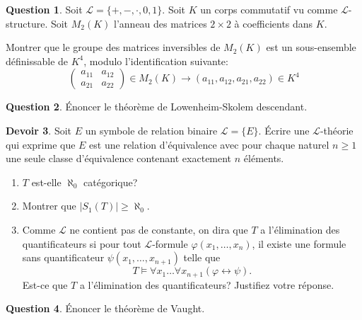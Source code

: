 \documentclass[a4paper, 12pt]{article}
\theoremstyle{definition} \newtheorem{quest}{Question}
\theoremstyle{definition} \newtheorem{dev}[quest]{Devoir}
\begin{document}
\begin{quest}
  Soit $\mathscr L=\{+, -, \cdot, 0, 1\}$.
  Soit $K$ un corps commutatif vu comme $\mathscr L$-structure.
  Soit $M_2(K)$ l'anneau des matrices $2\times 2$ à coefficients
  dans $K$.

  Montrer que le groupe des matrices inversibles de $M_2(K)$
  est un sous-ensemble définissable de $K^4$, modulo
  l'identification suivante:
  \begin{equation*}
    \left( \begin{matrix}
        a_{1 1} & a_{1 2} \\
        a_{2 1} & a_{2 2}
      \end{matrix} \right)\in M_2(K)
    \rightarrow (a_{1 1}, a_{1 2}, a_{2 1}, a_{2 2}) \in K^4
  \end{equation*}
\end{quest}

\begin{quest}
  \'{E}noncer le théorème de Lowenheim-Skolem descendant.
\end{quest}

\begin{dev}
  Soit $E$ un symbole de relation binaire $\mathscr L= \{E\}$.
  \'{E}crire une $\mathscr L$-théorie qui exprime que $E$ est
  une relation d'équivalence avec pour chaque naturel $n\geq 1$
  une seule classe d'équivalence contenant exactement $n$ éléments.
  \begin{enumerate}
  \item $T$ est-elle $\aleph_0$ catégorique?
  \item Montrer que $|S_1(T)|\geq \aleph_0$.
  \item Comme $\mathscr L$ ne contient pas de constante,
    on dira que $T$ a l'élimination des quantificateurs
    si pour tout $\mathscr L$-formule $\varphi(x_1, \ldots, x_n)$,
    il existe une formule sans quantificateur
    $\psi(x_1, \ldots, x_{n+1})$ telle que
    $$T\models \forall x_1 \ldots \forall x_{n+1}
    (\varphi\leftrightarrow \psi).$$
    Est-ce que $T$ a l'élimination des quantificateurs? Justifiez
    votre réponse.
  \end{enumerate}
\end{dev}

\begin{quest}
  \'{E}noncer le théorème de Vaught.
\end{quest}
\end{document}
